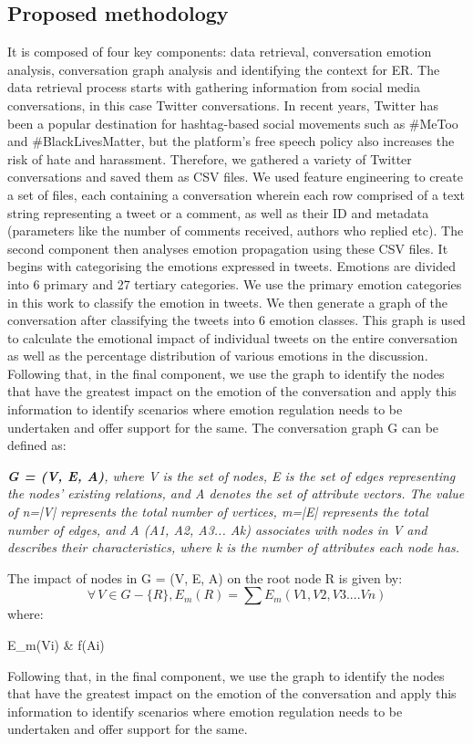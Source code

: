\subsection{Proposed methodology}
It is composed of four key components: data retrieval, conversation emotion analysis, conversation graph analysis and identifying the context for ER. The data retrieval process starts with gathering information from social media conversations, in this case Twitter conversations. In recent years, Twitter has been a popular destination for hashtag-based social movements such as \#MeToo and \#BlackLivesMatter, but the platform's free speech policy also increases the risk of hate and harassment. Therefore, we gathered a variety of Twitter conversations and saved them as CSV files. We used feature engineering to create a set of files, each containing a conversation wherein each row comprised of a text string representing a tweet or a comment, as well as their ID and metadata (parameters like the number of comments received, authors who replied etc). The second component then analyses emotion propagation using these CSV files. It begins with categorising the emotions expressed in tweets. Emotions are divided into 6 primary and 27 tertiary categories. We use the primary emotion categories in this work to classify the emotion in tweets. We then generate a graph of the conversation after classifying the tweets into 6 emotion classes. This graph is used to calculate the emotional impact of individual tweets on the entire conversation as well as the percentage distribution of various emotions in the discussion. Following that, in the final component, we use the graph to identify the nodes that have the greatest impact on the emotion of the conversation and apply this information to identify scenarios where emotion regulation needs to be undertaken and offer support for the same.
The conversation graph G can be defined as:


\textit{\textbf{G = (V, E, A)}, where V is the set of nodes, E is the set of edges representing the nodes' existing relations, and A denotes the set of attribute vectors. The value of n=|V| represents the total number of vertices, m=|E| represents the total number of edges, and A (A1, A2, A3... Ak) associates with nodes in V and describes their characteristics, where k is the number of attributes each node has.}



The impact of nodes in G = (V, E, A) on the root node R is given by:
\begin{equation}
\forall \,V \in G-\{R\},
E_{m}(R) = \sum{E_{m}(V1, V2, V3....Vn)}
\end{equation}
where:
\begin{conditions}
E_{m}(Vi) & f(Ai)
\end{conditions}
Following that, in the final component, we use the graph to identify the nodes that have the greatest impact on the emotion of the conversation and apply this information to identify scenarios where emotion regulation needs to be undertaken and offer support for the same.
 
